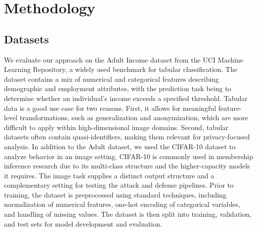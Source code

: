 \documentclass[conference]{IEEEtran}
\begin{document}
\section{Methodology}

\subsection{Datasets}
We evaluate our approach on the Adult Income dataset from the UCI Machine Learning Repository, a widely used benchmark for tabular classification. The dataset contains a mix of numerical and categorical features describing demographic and employment attributes, with the prediction task being to determine whether an individual’s income exceeds a specified threshold. 
Tabular data is a good use case for two reasons. First, it allows for meaningful feature-level transformations, such as generalization and anonymization, which are more difficult to apply within high-dimensional image domains. Second, tabular datasets often contain quasi-identifiers, making them relevant for privacy-focused analysis.
In addition to the Adult dataset, we used the CIFAR-10 dataset to analyze behavior in an image setting. CIFAR-10 is commonly used in membership inference research due to its multi-class structure and the higher-capacity models it requires. 
The image task supplies a distinct output structure and a complementary setting for testing the attack and defense pipelines.
Prior to training, the dataset is preprocessed using standard techniques, including normalization of numerical features, one-hot encoding of categorical variables, and handling of missing values. The dataset is then split into training, validation, and test sets for model development and evaluation.
\end{document}
